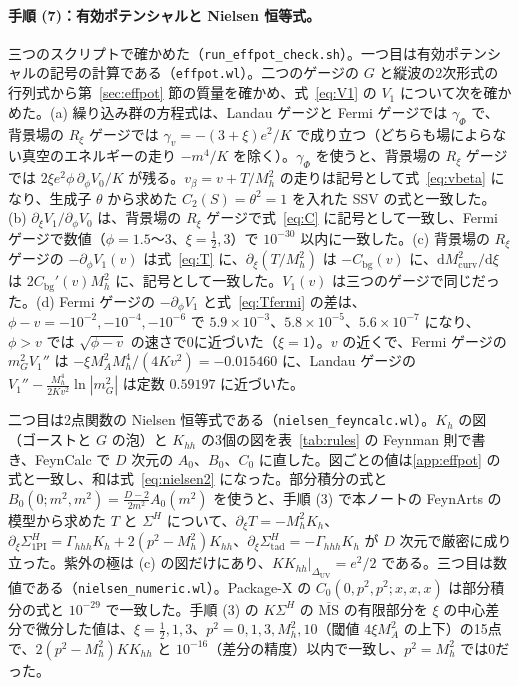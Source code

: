 \documentclass[a4paper,10pt]{ltjsarticle}
\newcommand{\dd}{\mathrm{d}}
\newcommand{\MSbar}{\overline{\mathrm{MS}}}
\newcommand{\DUV}{\Delta_{\mathrm{UV}}}
\begin{document}
\paragraph{手順 (7)：有効ポテンシャルと Nielsen 恒等式。}三つのスクリプトで確かめた（\texttt{run\_effpot\_check.sh}）。一つ目は有効ポテンシャルの記号の計算である（\texttt{effpot.wl}）。二つのゲージの $G$ と縦波の2次形式の行列式から第~\ref{sec:effpot} 節の質量を確かめ、式~\eqref{eq:V1} の $V_1$ について次を確かめた。(a) 繰り込み群の方程式は、Landau ゲージと Fermi ゲージでは $\gamma_\Phi$ で、背景場の $R_\xi$ ゲージでは $\gamma_v=-(3+\xi)e^2/K$ で成り立つ（どちらも場によらない真空のエネルギーの走り $-m^4/K$ を除く）。$\gamma_\Phi$ を使うと、背景場の $R_\xi$ ゲージでは $2\xi e^2\phi\,\partial_\phi V_0/K$ が残る。$v_\beta=v+T/M_h^2$ の走りは記号として式~\eqref{eq:vbeta} になり、生成子 $\theta$ から求めた $C_2(S)=\theta^2=1$ を入れた SSV の式と一致した。(b) $\partial_\xi V_1/\partial_\phi V_0$ は、背景場の $R_\xi$ ゲージで式~\eqref{eq:C} に記号として一致し、Fermi ゲージで数値（$\phi=1.5$〜$3$、$\xi=\frac12,3$）で $10^{-30}$ 以内に一致した。(c) 背景場の $R_\xi$ ゲージの $-\partial_\phi V_1(v)$ は式~\eqref{eq:T} に、$\partial_\xi(T/M_h^2)$ は $-C_{\mathrm{bg}}(v)$ に、$\dd M_{\mathrm{curv}}^2/\dd\xi$ は $2C_{\mathrm{bg}}'(v)M_h^2$ に、記号として一致した。$V_1(v)$ は三つのゲージで同じだった。(d) Fermi ゲージの $-\partial_\phi V_1$ と式~\eqref{eq:Tfermi} の差は、$\phi-v=-10^{-2},-10^{-4},-10^{-6}$ で $5.9\times10^{-3}$、$5.8\times10^{-5}$、$5.6\times10^{-7}$ になり、$\phi>v$ では $\sqrt{\phi-v}$ の速さで0に近づいた（$\xi=1$）。$v$ の近くで、Fermi ゲージの $m_G^2V_1''$ は $-\xi M_A^2M_h^4/(4Kv^2)=-0.015460$ に、Landau ゲージの $V_1''-\frac{M_h^4}{2Kv^2}\ln|m_G^2|$ は定数 $0.59197$ に近づいた。

二つ目は2点関数の Nielsen 恒等式である（\texttt{nielsen\_feyncalc.wl}）。$K_h$ の図（ゴーストと $G$ の泡）と $K_{hh}$ の3個の図を表~\ref{tab:rules} の Feynman 則で書き、FeynCalc で $D$ 次元の $A_0$、$B_0$、$C_0$ に直した。図ごとの値は\ref{app:effpot} の式と一致し、和は式~\eqref{eq:nielsen2} になった。部分積分の式と $B_0(0;m^2,m^2)=\frac{D-2}{2m^2}A_0(m^2)$ を使うと、手順 (3) で本ノートの FeynArts の模型から求めた $T$ と $\Sigma^H$ について、$\partial_\xi T=-M_h^2K_h$、$\partial_\xi\Sigma^H_{\mathrm{1PI}}=\Gamma_{hhh}K_h+2(p^2-M_h^2)K_{hh}$、$\partial_\xi\Sigma^H_{\mathrm{tad}}=-\Gamma_{hhh}K_h$ が $D$ 次元で厳密に成り立った。紫外の極は (c) の図だけにあり、$KK_{hh}|_{\DUV}=e^2/2$ である。三つ目は数値である（\texttt{nielsen\_numeric.wl}）。Package-X の $C_0(0,p^2,p^2;x,x,x)$ は部分積分の式と $10^{-29}$ で一致した。手順 (3) の $K\Sigma^H$ の $\MSbar$ の有限部分を $\xi$ の中心差分で微分した値は、$\xi=\frac12,1,3$、$p^2=0,1,3,M_h^2,10$（閾値 $4\xi M_A^2$ の上下）の15点で、$2(p^2-M_h^2)KK_{hh}$ と $10^{-16}$（差分の精度）以内で一致し、$p^2=M_h^2$ では0だった。
\end{document}

